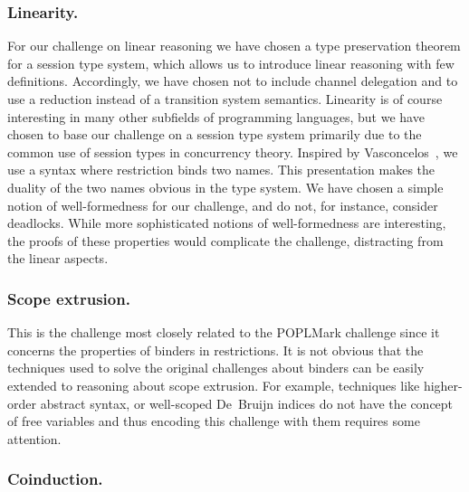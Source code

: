 \documentclass[runningheads]{llncs}
\begin{document}


\subsubsection{Linearity.}
For our challenge on linear reasoning we have chosen a type preservation theorem
for a session type system, which allows us to introduce linear
reasoning with few definitions. Accordingly, we have chosen not to
include channel delegation and to use a reduction instead of a
transition system semantics.
Linearity is of course interesting in many other subfields of programming languages, but we have chosen to base our challenge on a session type system primarily due to the common use of session types in concurrency theory.
Inspired by Vasconcelos~\cite{Vasconcelos2012}, we use a syntax where
restriction binds two names. This presentation makes the duality
of the two names obvious in the type system.
We have chosen a simple notion of well-formedness for our challenge,
and do not, for instance, consider deadlocks. While more
sophisticated notions of well-formedness are interesting, the
proofs of these properties would complicate the challenge, distracting from the linear aspects.

\subsubsection{Scope extrusion.}
This is the challenge most closely related to the POPLMark
challenge since it concerns the properties of binders in restrictions.
It is not obvious that the techniques used to solve the original challenges about binders can be easily extended to reasoning about scope extrusion.
For example, techniques like higher-order abstract syntax, or well-scoped
De\ Bruijn indices do not have the concept of free variables and thus encoding this challenge with them requires some attention.

\subsubsection{Coinduction.}
\end{document}
